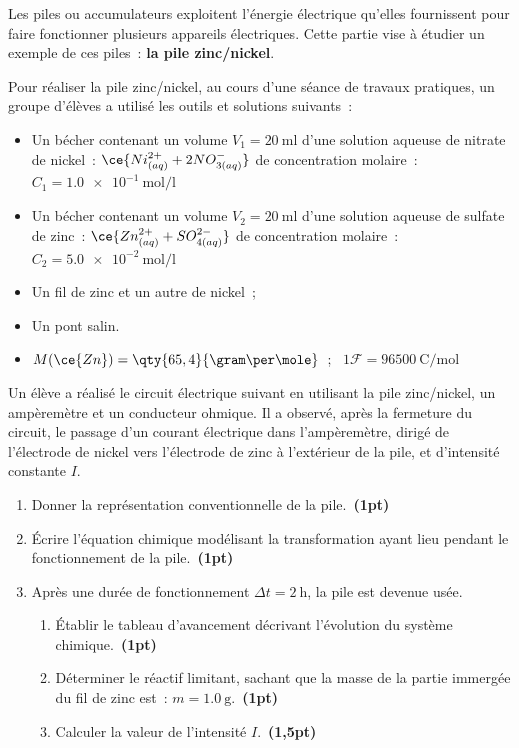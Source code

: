 Les piles ou accumulateurs exploitent l'énergie électrique qu'elles fournissent
pour faire fonctionner plusieurs appareils électriques. Cette partie vise à
étudier un exemple de ces piles~: \textbf{la pile zinc/nickel}.

Pour réaliser la pile zinc/nickel, au cours d'une séance de travaux pratiques,
un groupe d'élèves a utilisé les outils et solutions suivants~:
\begin{itemize}
    \item Un bécher contenant un volume $V_1=\qty{20}{\milli\litre}$ d'une
          solution aqueuse de nitrate de nickel~:
          ${\ce{Ni^{2+}_{(aq)} + 2NO^{-}_{3(aq)}}}$ de concentration molaire~:
          $C_1=\qty{1,0e-1}{\mole\per\litre}$
    \item Un bécher contenant un volume $V_2=\qty{20}{\milli\litre}$ d'une
          solution aqueuse de sulfate de zinc~:
          ${\ce{Zn^{2+}_{(aq)} + SO^{2-}_{4(aq)}}}$ de concentration molaire~:
          $C_2=\qty{5,0e-2}{\mole\per\litre}$
    \item Un fil de zinc et un autre de nickel~;
    \item Un pont salin.
\end{itemize}

\begin{donnees}
    \begin{itemize}
        \item ${M(\ce{Zn})=\qty{65,4}{\gram\per\mole}}$~; \
              ${1\mathcal{F}=\qty{96500}{\coulomb\per\mole}}$
    \end{itemize}
\end{donnees}
Un élève a réalisé le circuit électrique suivant en utilisant la pile
zinc/nickel, un ampèremètre et un conducteur ohmique. Il a observé, après la
fermeture du circuit, le passage d'un courant électrique dans l'ampèremètre,
dirigé de l'électrode de nickel vers l'électrode de zinc à l'extérieur de la
pile, et d'intensité constante $I$.

\begin{enumerate}
    \item Donner la représentation conventionnelle de la pile.~\textbf{(1pt)}
    \item Écrire l'équation chimique modélisant la transformation ayant lieu
          pendant le fonctionnement de la pile.~\textbf{(1pt)}
    \item Après une durée de fonctionnement $\Delta t=\qty{2}{\hour}$, la pile
          est devenue usée.
          \begin{enumerate}
              \item Établir le tableau d'avancement décrivant l'évolution du
                    système chimique.~\textbf{(1pt)}
              \item Déterminer le réactif limitant, sachant que la masse de la
                    partie immergée du fil de zinc est~:
                    $m=\qty{1,0}{\gram}$.~\textbf{(1pt)}
              \item Calculer la valeur de l'intensité $I$.~\textbf{(1,5pt)}
          \end{enumerate}
\end{enumerate}

